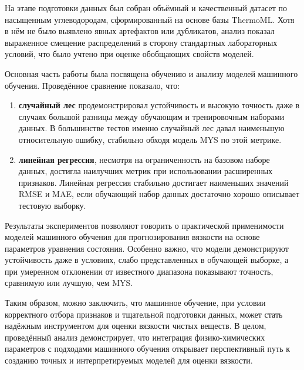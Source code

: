 \documentclass[a4paper,12pt]{article}
\begin{document}
  На этапе подготовки данных был собран объёмный и качественный датасет по насыщенным углеводородам, сформированный на основе базы ThermoML. Хотя в нём не было выявлено явных артефактов или дубликатов, анализ показал выраженное смещение распределений в сторону стандартных лабораторных условий, что было учтено при оценке обобщающих свойств моделей.

  Основная часть работы была посвящена обучению и анализу моделей машинного обучения. Проведённое сравнение показало, что:

  \begin{enumerate}
    \item \textbf{случайный лес} продемонстрировал устойчивость и высокую точность даже в случаях большой разницы между обучающим и тренировочным наборами данных. В большинстве тестов именно случайный лес давал наименьшую относительную ошибку, стабильно обходя модель MYS по этой метрике.

    \item \textbf{линейная регрессия}, несмотря на ограниченность на базовом наборе данных, достигла наилучших метрик при использовании расширенных признаков. Линейная регрессия стабильно достигает наименьших значений RMSE и MAE, если обучающий набор данных достаточно хорошо описывает тестовую выборку.  
  \end{enumerate}

  Результаты экспериментов позволяют говорить о практической применимости моделей машинного обучения для прогнозирования вязкости на основе параметров уравнения состояния. Особенно важно, что модели демонстрируют устойчивость даже в условиях, слабо представленных в обучающей выборке, а при умеренном отклонении от известного диапазона показывают точность, сравнимую или лучшую, чем MYS.

Таким образом, можно заключить, что машинное обучение, при условии корректного отбора признаков и тщательной подготовки данных, может стать надёжным инструментом для оценки вязкости чистых веществ. В целом, проведённый анализ демонстрирует, что интеграция физико-химических параметров с подходами машинного обучения открывает перспективный путь к созданию точных и интерпретируемых моделей для оценки вязкости.


\newpage
\end{document}
